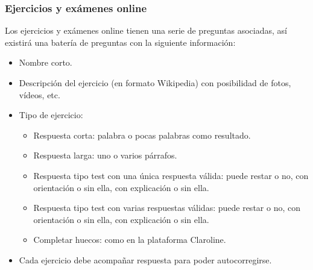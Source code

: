 \documentclass[12pt,twoside,a4paper]{article}
\begin{document}
\subsubsection{Ejercicios y exámenes online}
Los ejercicios y exámenes online tienen una serie de preguntas asociadas, así existirá una batería de preguntas con la siguiente información:
\begin{itemize}
\item Nombre corto.
\item Descripción del ejercicio (en formato Wikipedia) con posibilidad de fotos, vídeos, etc.
\item Tipo de ejercicio:
  \begin{itemize}
  \item Respuesta corta: palabra o pocas palabras como resultado.
  \item Respuesta larga: uno o varios párrafos.
  \item Respuesta tipo test con una única respuesta válida: puede restar o no, con orientación o sin ella, con explicación o sin ella.
  \item Respuesta tipo test con varias respuestas válidas: puede restar o no, con orientación o sin ella, con explicación o sin ella.
  \item Completar huecos: como en la plataforma Claroline.
  \end{itemize}
\item Cada ejercicio debe acompañar respuesta para poder autocorregirse.
\end{itemize}
\end{document}
